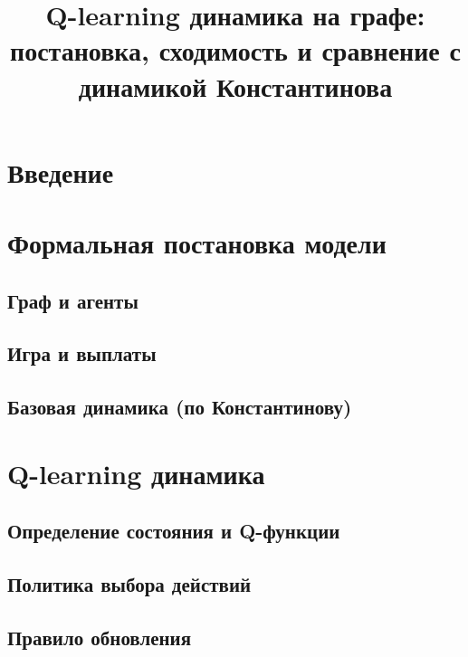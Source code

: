 \documentclass[a4paper, fontsize=14pt]{article}
\title{Q-learning динамика на графе: постановка, сходимость и сравнение с динамикой Константинова}
\author{}
\date{}
\theoremstyle{plain}
\theoremstyle{definition}
\begin{document}
\maketitle

\section{Введение}

\section{Формальная постановка модели}
\subsection{Граф и агенты}

\subsection{Игра и выплаты}

\subsection{Базовая динамика (по Константинову)}

\section{Q-learning динамика}
\subsection{Определение состояния и Q-функции}

\subsection{Политика выбора действий}

\subsection{Правило обновления}
\end{document}
